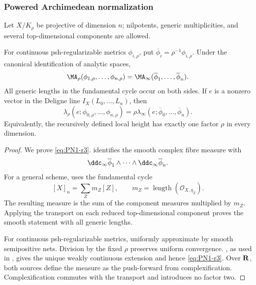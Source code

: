 \subsubsection{Powered Archimedean normalization}

Let $X/K_\rho$ be projective of dimension $n$; nilpotents, generic
multiplicities, and several top-dimensional components are allowed.

\begin{theorem}
\label{thm:powered-normalization}
For continuous psh-regularizable metrics $\phi_{i,\rho}$, put
$\overline\phi_i=\rho^{-1}\phi_{i,\rho}$.  Under the canonical
identification of analytic spaces,
\begin{equation}
 \MA_\rho(\phi_{1,\rho},\ldots,\phi_{n,\rho})
 =\MA_\infty(\overline\phi_1,\ldots,\overline\phi_n).
\label{eq:PN1-r3}
\end{equation}
All generic lengths in the fundamental cycle occur on both sides.  If $e$
is a nonzero vector in the Deligne line $I_X(L_0,\ldots,L_n)$, then
\begin{equation}
 \lambda_\rho(e;\phi_{0,\rho},\ldots,\phi_{n,\rho})
 =\rho\lambda_\infty
 (e;\overline\phi_0,\ldots,\overline\phi_n).
\label{eq:PN2-r3}
\end{equation}
Equivalently, the recursively defined local height has exactly one factor
$\rho$ in every dimension.
\end{theorem}

\begin{proof}
We prove \eqref{eq:PN1-r3}.   identifies the smooth
complex fibre measure with
\[
 \ddc_\infty\overline\phi_1\wedge\cdots\wedge
 \ddc_\infty\overline\phi_n.
\]
For a general scheme, \cite[formula~(8.1)]{BE21} uses the fundamental cycle
\[
 [X]_n=\sum_Zm_Z[Z],
 \qquad
 m_Z=\operatorname{length}(\mathcal O_{X,\eta_Z}).
\]
The resulting measure is the sum of the component measures multiplied by
$m_Z$.
Applying the transport on each reduced top-dimensional component proves the
smooth statement with all generic lengths.

For continuous psh-regularizable metrics, uniformly approximate by smooth
semipositive nets.  Division by the fixed $\rho$ preserves uniform
convergence.  \cite[Theorem~8.4]{BE21}, as used in
\cite[Theorem~4.3]{PS23Hybrid}, gives the unique weakly continuous extension
and hence
\eqref{eq:PN1-r3}.  Over $\mathbf R$, both sources define the measure as the
push-forward from complexification.  Complexification commutes with the
transport and introduces no factor two.
\end{proof}

